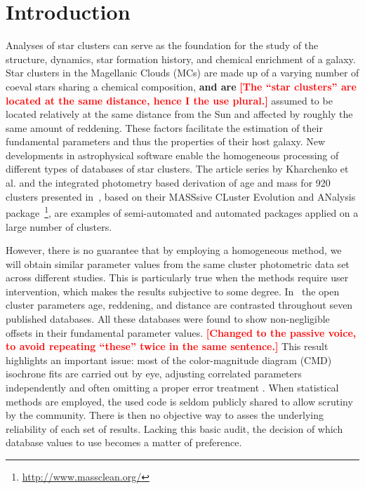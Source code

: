 \documentclass[draft]{aa}
\newcommand{\LEt}[1]{\textcolor{red}{\textbf{[#1]}}}
\begin{document}
\maketitle
%

\section{Introduction}
\label{sec:intro}

Analyses of star clusters can serve as the foundation for the study of the
structure, dynamics, star formation history, and chemical enrichment of a
galaxy.
Star clusters in the Magellanic Clouds (MCs) are made up of a varying number of
coeval stars sharing a chemical composition, \textbf{and are} \LEt{The ``star
clusters'' are located at the same distance, hence I the use plural.} assumed to
be located relatively at the same distance from the Sun and affected by roughly
the same amount of reddening. These factors facilitate the estimation of
their fundamental parameters and thus the properties of their host galaxy.
%
New developments in astrophysical software enable the homogeneous
processing of different types of databases of star clusters. The article series
by Kharchenko et al. 
\citep[see][and references therein]{Kharchenko_2005,Schmeja_2014}
and the integrated photometry based derivation of age and mass for 920 clusters
presented
in~\cite{Popescu_2012}, based on their MASSsive CLuster Evolution and
ANalysis package~\citep[MASSCLEAN;][]{Popescu_2009}\footnote{
\url{http://www.massclean.org/}}, are examples of semi-automated and automated
packages applied on a large number of clusters.

However, there is no guarantee that by employing a homogeneous method, we will
obtain similar parameter values from the same cluster photometric
data set across different studies. This is particularly true when the methods
require user intervention, which makes the results subjective to some degree.
%
In~\cite{Netopil_2015} the open cluster parameters age, reddening, and distance
are contrasted throughout seven published databases. All these databases were
found to show non-negligible offsets in their fundamental parameter
values. \LEt{Changed to the passive voice, to avoid repeating ``these'' twice in
the same sentence.}
%
This result highlights an important issue: most of the color-magnitude diagram 
(CMD) isochrone fits are carried out by eye, adjusting correlated parameters
independently and often omitting a proper error treatment \citep[see]
[for a more detailed description of this problem]{vonHippel_2014}.
%
When statistical methods are employed, the used code is seldom publicly
shared to allow scrutiny by the community. There is then no objective way to
asses the underlying reliability of each set of results.
Lacking this basic audit, the decision of which database values to use
becomes a matter of preference.
\end{document}
